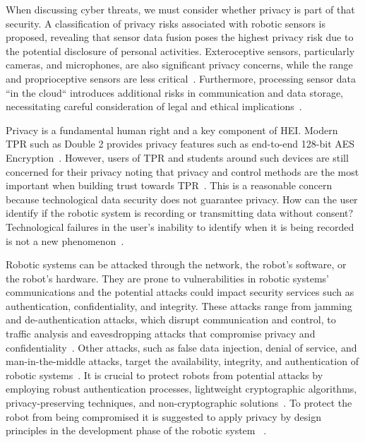 When discussing cyber threats, we must consider whether privacy is part of that security. A classification of privacy risks
associated with robotic sensors is proposed, revealing that sensor data fusion poses the highest privacy risk due to the potential
disclosure of personal activities. Exteroceptive sensors, particularly cameras, and microphones, are also significant privacy concerns,
while the range and proprioceptive sensors are less critical~\cite[81]{cyber_sec_robotics_privacy_safety_2017}. Furthermore, processing
sensor data ``in the cloud`` introduces
additional risks in communication and data storage, necessitating careful consideration of legal and ethical implications~\cite[82-84]{cyber_sec_robotics_privacy_safety_2017}.

Privacy is a fundamental human right and a key component of \ac{HEI}. Modern \ac{TPR} such as Double 2 provides privacy features such as
end-to-end 128-bit AES Encryption~\cite[544]{telepresence_robots_in_classroom_2019}. However, users of \ac{TPR} and students around such devices are still concerned for
their privacy noting that privacy and control methods are the
most important when building trust towards \ac{TPR}~\cite[59]{telepresence_perspective_psychology_educational_2022}.
This is a reasonable concern because technological data security does not guarantee privacy. How can the user identify if the robotic
system is recording or transmitting data without consent? Technological failures in the user's inability to identify when it is being recorded is not a new phenomenon~\cite[]{is_my_phone_listening_2019}.

Robotic systems can be attacked through the network, the robot's software, or the robot's hardware. They are prone to vulnerabilities in
robotic
systems'
communications and the potential attacks could impact security services such as authentication, confidentiality, and
integrity. These attacks range from jamming and de-authentication attacks, which disrupt communication and control, to traffic analysis
and eavesdropping attacks that compromise privacy and confidentiality~\cite[122]{robotics_cyber_security_2022}. Other attacks, such as false data injection, denial of service,
and man-in-the-middle attacks, target the availability, integrity, and authentication of robotic systems~\cite[126-128]{
  robotics_cyber_security_2022}. It is crucial to protect robots from potential attacks by employing robust authentication processes,
lightweight cryptographic algorithms, privacy-preserving techniques, and non-cryptographic solutions~\cite[147-149]{
  robotics_cyber_security_2022}. To protect the robot from being compromised it is suggested to apply privacy by design principles in the
development phase of the robotic system ~\cite[]{smart_design_engineering_2020,role_of_security_in_human_robot_2017, robotics_cyber_security_2022}.

